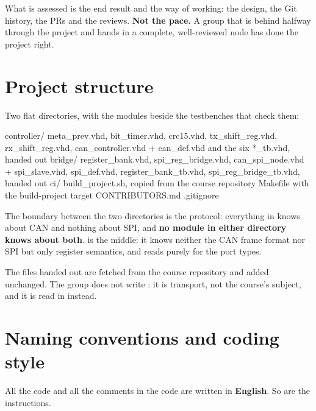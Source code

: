 What is assessed is the end result and the way of working: the design, the Git history, the PRs and
the reviews. \textbf{Not the pace.} A group that is behind halfway through the project and hands in a
complete, well-reviewed node has done the project right.

\section{Project structure}
\label{app:project:layout}

Two flat directories, with the modules beside the testbenches that check them:

\begin{textdrawing}
controller/   meta_prev.vhd, bit_timer.vhd, crc15.vhd,
              tx_shift_reg.vhd, rx_shift_reg.vhd, can_controller.vhd
              + can_def.vhd and the six *_tb.vhd, handed out
bridge/       register_bank.vhd, spi_reg_bridge.vhd, can_spi_node.vhd
              + spi_slave.vhd, spi_def.vhd, register_bank_tb.vhd,
                spi_reg_bridge_tb.vhd, handed out
ci/           build_project.sh, copied from the course repository
Makefile      with the build-project target
CONTRIBUTORS.md
.gitignore
\end{textdrawing}

The boundary between the two directories is the protocol: everything in  knows
about CAN and nothing about SPI, and \textbf{no module in either directory knows about both}.
 is the middle: it knows neither the CAN frame format nor SPI but only register
semantics, and reads  purely for the port types.

The files handed out are fetched from the course repository and added unchanged. The group does not
write : it is transport, not the course's subject, and it is read in
 instead.

\section{Naming conventions and coding style}
\label{app:project:style}

All the code and all the comments in the code are written in \textbf{English}. So are the
instructions.

